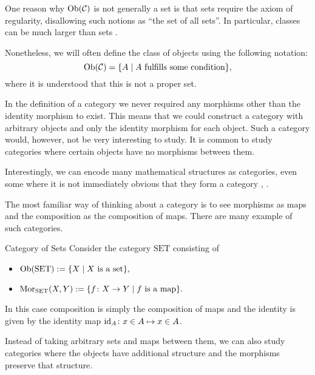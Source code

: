 One reason why $\mathrm {Ob}(\mathcal{C})$ is not generally a set is that sets require the axiom of regularity, 
disallowing such notions as ``the set of all sets''. In particular, classes can be much larger than sets \cite[p.~1]{Roman2017}.

Nonetheless, we will often define the class of objects using the following notation:
$$
\mathrm {Ob}(\mathcal{C}) = \{A \mid \text{$A$ fulfills some condition}\},
$$
where it is understood that this is not a proper set.

In the definition of a category we never required any morphisms other than the identity morphism to exist.
This means that we could construct a category with arbitrary objects and only the identity morphism for each object. 
Such a category would, however, not be very interesting to study.
It is common to study categories where certain objects have no morphisms between them.

Interestingly, we can encode many mathematical structures as categories, even some where it is not immediately obvious that they form a category \cite[Chap.~1~Ex.~1-7]{Roman2017}, \cite[Sec.~1.1]{Leinster2014-dc}.

The most familiar way of thinking about a category is to see morphisms as maps and the composition as the composition of maps. There are many example of such categories.

\begin{example}{Category of Sets}{}
Consider the category $\mathrm{SET}$ consisting of
\begin{itemize}
    \item $\mathrm {Ob}(\mathrm{SET}) := \{X \mid \text{$X$ is a set}\},$
    \item $\mathrm {Mor}_{\mathrm{SET}}(X,Y) := \{f\colon X \to Y \mid \text{$f$ is a map}\}.$
\end{itemize}
In this case composition is simply the composition of maps and the identity is given by the identity map $\mathrm{id}_A\colon x \in A \mapsto x \in A$.
\end{example}

Instead of taking arbitrary sets and maps between them, we can also study categories where the objects have additional structure and the morphisms preserve that structure.

